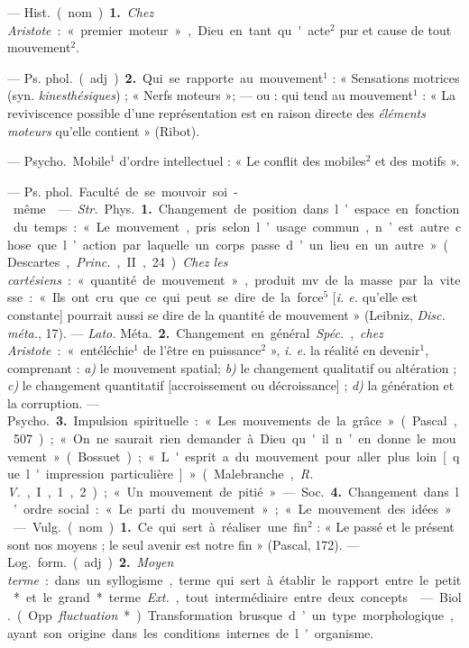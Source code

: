 \begin{itemize}[leftmargin=1cm, label=, itemsep=1pt]
 — \si{Hist.} (nom). {\bf 1.} {\it Chez Aristote} : « premier
moteur », Dieu en tant qu'acte$^2$ pur et cause de tout mouvement$^2$.

— \si{Ps. phol.} (adj.). {\bf 2.} Qui se rapporte au mouvement$^1$ :
« Sensations motrices (syn. {\it kinesthésiques}) ; « Nerfs moteurs »; — ou :
qui tend au mouvement$^1$ : « La reviviscence possible d’une représentation
est en raison directe des {\it éléments moteurs} qu’elle contient » (Ribot).

 — \si{Psycho.} Mobile$^1$ d'ordre intellectuel : « Le conflit des
mobiles$^2$ et des motifs ».

 — \si{Ps. phol.} Faculté de se mouvoir soi-même.

 — {\it Str.} \si{Phys.} {\bf 1.} Changement de position dans
l’espace en fonction du temps : « Le mouvement, pris selon l’usage commun,
n’est autre chose que l’action par laquelle un corps passe d’un lieu en un
autre » (Descartes, {\it Princ.}, II, 24).
{\it Chez les cartésiens} : « quantité de mouvement », produit mv de la masse
par la vitesse : « Ils ont cru que ce qui peut se dire de la force$^5$
[{\it i. e.} qu’elle est constante] pourrait aussi se dire de la quantité de
mouvement » (Leibniz, {\it Disc. méta.}, 17). — {\it Lato.} \si{Méta.}
{\bf 2.} Changement en général. {\it Spéc.}, {\it chez Aristote} :
« entéléchie$^1$ de l’être en puissance$^2$ », {\it i. e.} la réalité en
devenir$^1$, comprenant : {\it a)} le mouvement spatial; {\it b)} le
changement qualitatif ou altération ; {\it c)} le changement quantitatif
[accroissement ou décroissance] ; {\it d)} la génération et la corruption. —
\si{Psycho.} {\bf 3.} Impulsion spirituelle : « Les mouvements de la
grâce » (Pascal, 507) ; « On ne saurait rien demander à Dieu qu'il n’en donne
le mouvement » (Bossuet) ; « L'esprit a du mouvement pour aller plus loin
[que l'impression particulière] » (Malebranche, {\it R. V.}, I, 1, 2) ; « Un
mouvement de pitié » — \si{Soc.} {\bf 4.} Changement dans l’ordre social :
« Le parti du mouvement » ; « Le mouvement des idées ».

 — \si{Vulg.} (nom). {\bf 1.} Ce qui sert à réaliser une fin$^2$ :
« Le passé et le présent sont nos moyens ; le seul avenir est notre
fin » (Pascal, 172). — \si{Log.} \si{form.} (adj). {\bf 2.} {\it Moyen terme} : dans
un syllogisme, terme qui sert à établir le rapport entre le petit* et le
grand* terme. {\it Ext.}, tout intermédiaire entre deux concepts.

 — \si{Biol.} (Opp. {\it fluctuation}*). Transformation brusque
d’un type morphologique, ayant son origine dans les conditions internes de
l'organisme.


\end{itemize}
